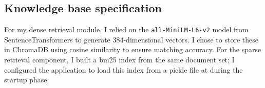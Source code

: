 \subsection{Knowledge base specification}

\begin{table}[H]
\centering
\caption{Knowledge base v2 composition}
\renewcommand{\arraystretch}{1.1}
\end{table}

For my dense retrieval module, I relied on the \texttt{all-MiniLM-L6-v2} model from SentenceTransformers to generate 384-dimensional vectors. I chose to store these in ChromaDB using cosine similarity to ensure matching accuracy. For the sparse retrieval component, I built a \ac{bm25} index from the same document set; I configured the application to load this index from a pickle file at  during the startup phase.
